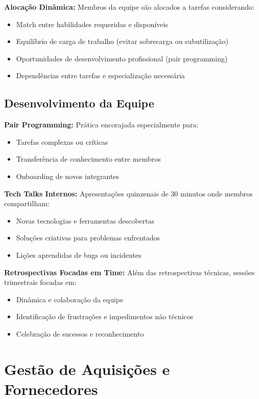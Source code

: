 \textbf{Alocação Dinâmica:} Membros da equipe são alocados a tarefas considerando:
\begin{itemize}
    \item Match entre habilidades requeridas e disponíveis
    \item Equilíbrio de carga de trabalho (evitar sobrecarga ou subutilização)
    \item Oportunidades de desenvolvimento profissional (pair programming)
    \item Dependências entre tarefas e especialização necessária
\end{itemize}

\subsection{Desenvolvimento da Equipe}

\textbf{Pair Programming:} Prática encorajada especialmente para:
\begin{itemize}
    \item Tarefas complexas ou críticas
    \item Transferência de conhecimento entre membros
    \item Onboarding de novos integrantes
\end{itemize}

\textbf{Tech Talks Internos:} Apresentações quinzenais de 30 minutos onde membros compartilham:
\begin{itemize}
    \item Novas tecnologias e ferramentas descobertas
    \item Soluções criativas para problemas enfrentados
    \item Lições aprendidas de bugs ou incidentes
\end{itemize}

\textbf{Retrospectivas Focadas em Time:} Além das retrospectivas técnicas, sessões trimestrais focadas em:
\begin{itemize}
    \item Dinâmica e colaboração da equipe
    \item Identificação de frustrações e impedimentos não técnicos
    \item Celebração de sucessos e reconhecimento
\end{itemize}

\section{Gestão de Aquisições e Fornecedores}

